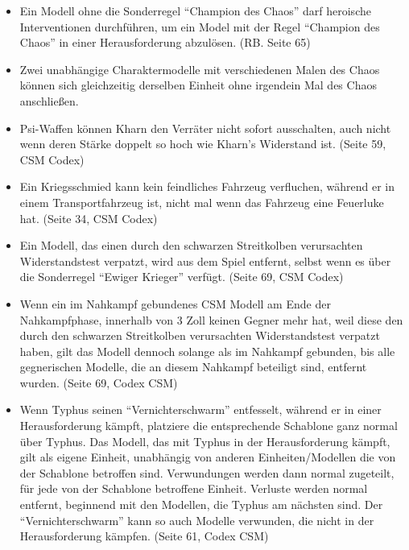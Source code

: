 \begin{itemize}

 \item Ein Modell ohne die Sonderregel ``Champion des Chaos'' darf heroische
  Interventionen durchführen, um ein Model mit der Regel ``Champion des Chaos''
  in einer Herausforderung abzulösen. (RB. Seite 65)

 \item Zwei unabhängige Charaktermodelle mit verschiedenen Malen des Chaos
  können sich gleichzeitig derselben Einheit ohne irgendein Mal des Chaos
  anschließen.

 \item Psi-Waffen können Kharn den Verräter nicht sofort ausschalten, auch nicht
  wenn deren Stärke doppelt so hoch wie Kharn's Widerstand ist. (Seite 59, CSM
  Codex)

 \item Ein Kriegsschmied kann kein feindliches Fahrzeug verfluchen, während er
  in einem Transportfahrzeug ist, nicht mal wenn das Fahrzeug eine Feuerluke
  hat. (Seite 34, CSM Codex)

 \item Ein Modell, das einen durch den schwarzen Streitkolben verursachten
  Widerstandstest verpatzt, wird aus dem Spiel entfernt, selbst wenn es über die
  Sonderregel ``Ewiger Krieger'' verfügt. (Seite 69, CSM Codex)

 \item Wenn ein im Nahkampf gebundenes CSM Modell am Ende der Nahkampfphase,
  innerhalb von 3 Zoll keinen Gegner mehr hat, weil diese den durch den
  schwarzen Streitkolben verursachten Widerstandstest verpatzt haben, gilt das
  Modell dennoch solange als im Nahkampf gebunden, bis alle gegnerischen
  Modelle, die an diesem Nahkampf beteiligt sind, entfernt wurden. (Seite 69,
  Codex CSM)

 \item Wenn Typhus seinen ``Vernichterschwarm'' entfesselt, während er in einer
  Herausforderung kämpft, platziere die entsprechende Schablone ganz normal über
  Typhus. Das Modell, das mit Typhus in der Herausforderung kämpft, gilt als
  eigene Einheit, unabhängig von anderen Einheiten/Modellen die von der
  Schablone betroffen sind. Verwundungen werden dann normal zugeteilt, für jede
  von der Schablone betroffene Einheit. Verluste werden normal entfernt,
  beginnend mit den Modellen, die Typhus am nächsten sind. Der
  ``Vernichterschwarm'' kann so auch Modelle verwunden, die nicht in der
  Herausforderung kämpfen. (Seite 61, Codex CSM)


\end{itemize}
